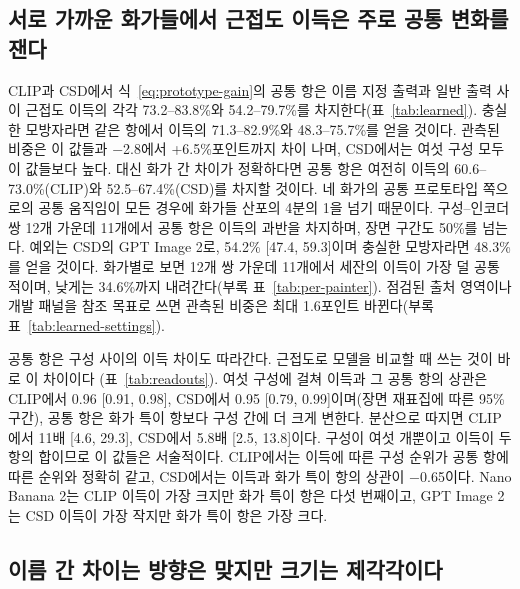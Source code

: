 \documentclass[10pt]{article}
\begin{document}
\subsection{서로 가까운 화가들에서 근접도 이득은 주로 공통 변화를 잰다}\label{sec:learned}




CLIP과 CSD에서 식~\ref{eq:prototype-gain}의 공통 항은 이름 지정 출력과 일반 출력 사이 근접도 이득의
각각 73.2--83.8\%와 54.2--79.7\%를 차지한다(표~\ref{tab:learned}). 충실한 모방자라면 같은 항에서
이득의 71.3--82.9\%와 48.3--75.7\%를 얻을 것이다. 관측된 비중은 이 값들과 $-$2.8에서 +6.5\%포인트까지
차이 나며, CSD에서는 여섯 구성 모두 이 값들보다 높다. 대신 화가 간 차이가 정확하다면 공통 항은 여전히
이득의 60.6--73.0\%(CLIP)와 52.5--67.4\%(CSD)를 차지할 것이다. 네 화가의 공통 프로토타입 쪽으로의
공통 움직임이 모든 경우에 화가들 산포의 4분의 1을 넘기 때문이다. 구성--인코더 쌍 12개 가운데 11개에서
공통 항은 이득의 과반을 차지하며, 장면 구간도 50\%를 넘는다. 예외는 CSD의 GPT Image 2로, 54.2\%
[47.4, 59.3]이며 충실한 모방자라면 48.3\%를 얻을 것이다. 화가별로 보면 12개 쌍 가운데 11개에서 세잔의
이득이 가장 덜 공통적이며, 낮게는 34.6\%까지 내려간다(부록 표~\ref{tab:per-painter}). 점검된 출처
영역이나 개발 패널을 참조 목표로 쓰면 관측된 비중은 최대 1.6포인트 바뀐다(부록
표~\ref{tab:learned-settings}).

공통 항은 구성 사이의 이득 차이도 따라간다. 근접도로 모델을 비교할 때 쓰는 것이 바로 이 차이이다
(표~\ref{tab:readouts}). 여섯 구성에 걸쳐 이득과 그 공통 항의 상관은 CLIP에서 0.96 [0.91, 0.98],
CSD에서 0.95 [0.79, 0.99]이며(장면 재표집에 따른 95\% 구간), 공통 항은 화가 특이 항보다 구성 간에 더
크게 변한다. 분산으로 따지면 CLIP에서 11배 [4.6, 29.3], CSD에서 5.8배 [2.5, 13.8]이다. 구성이 여섯
개뿐이고 이득이 두 항의 합이므로 이 값들은 서술적이다. CLIP에서는 이득에 따른 구성 순위가 공통 항에
따른 순위와 정확히 같고, CSD에서는 이득과 화가 특이 항의 상관이 $-$0.65이다. Nano Banana 2는 CLIP
이득이 가장 크지만 화가 특이 항은 다섯 번째이고, GPT Image 2는 CSD 이득이 가장 작지만 화가 특이 항은
가장 크다.

\subsection{이름 간 차이는 방향은 맞지만 크기는 제각각이다}\label{sec:agreement}


\end{document}
